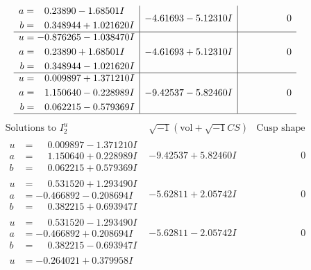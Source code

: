 \documentclass[1p]{elsarticle_modified}
\theoremstyle{definition}
\newcommand{\I}{\sqrt{-1}}
\begin{document}
$$\begin{array}{c|c|c}
\begin{aligned}
a &= \phantom{-}0.23890 - 1.68501 I \\
b &= \phantom{-}0.348944 + 1.021620 I\end{aligned}
 & -4.61693 - 5.12310 I & \phantom{-0.000000 } 0 \\ \hline\begin{aligned}
u &= -0.876265 - 1.038470 I \\
a &= \phantom{-}0.23890 + 1.68501 I \\
b &= \phantom{-}0.348944 - 1.021620 I\end{aligned}
 & -4.61693 + 5.12310 I & \phantom{-0.000000 } 0 \\ \hline\begin{aligned}
u &= \phantom{-}0.009897 + 1.371210 I \\
a &= \phantom{-}1.150640 - 0.228989 I \\
b &= \phantom{-}0.062215 - 0.579369 I\end{aligned}
 & -9.42537 - 5.82460 I & \phantom{-0.000000 } 0\\
 \hline 
 \end{array}$$\newpage$$\begin{array}{c|c|c}  
\text{Solutions to }I^u_{2}& \I (\text{vol} + \sqrt{-1}CS) & \text{Cusp shape}\\
 \hline 
\begin{aligned}
u &= \phantom{-}0.009897 - 1.371210 I \\
a &= \phantom{-}1.150640 + 0.228989 I \\
b &= \phantom{-}0.062215 + 0.579369 I\end{aligned}
 & -9.42537 + 5.82460 I & \phantom{-0.000000 } 0 \\ \hline\begin{aligned}
u &= \phantom{-}0.531520 + 1.293490 I \\
a &= -0.466892 - 0.208694 I \\
b &= \phantom{-}0.382215 + 0.693947 I\end{aligned}
 & -5.62811 + 2.05742 I & \phantom{-0.000000 } 0 \\ \hline\begin{aligned}
u &= \phantom{-}0.531520 - 1.293490 I \\
a &= -0.466892 + 0.208694 I \\
b &= \phantom{-}0.382215 - 0.693947 I\end{aligned}
 & -5.62811 - 2.05742 I & \phantom{-0.000000 } 0 \\ \hline\begin{aligned}
u &= -0.264021 + 0.379958 I \\

\end{aligned}
\end{array}$$
\end{document}
